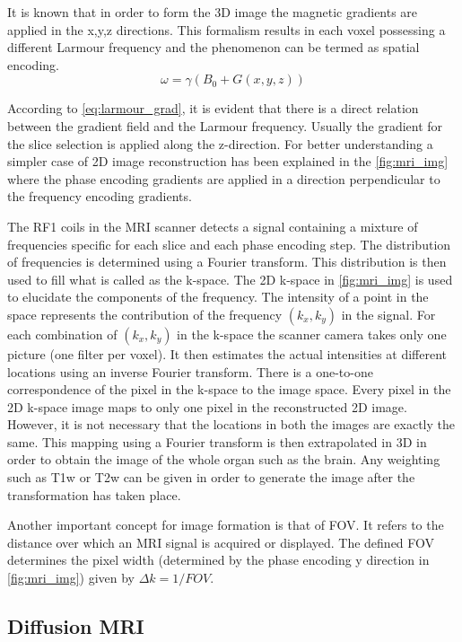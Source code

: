 \documentclass[msthesis.tex]{subfiles}
\begin{document}
It is known that in order to form the 3D image the magnetic gradients are applied in the x,y,z directions. This formalism results in each voxel possessing a different Larmour frequency and the phenomenon can be termed as spatial encoding. 
\begin{equation}
        \label{eq:larmour_grad}
          \omega = \gamma(B_0 + G(x, y, z))
     \end{equation}
       
According to \cref{eq:larmour_grad}, it is evident that there is a direct relation between the gradient field and the Larmour frequency. Usually the gradient for the slice selection is applied along the z-direction. For better understanding a simpler case of 2D image reconstruction has been explained in the \cref{fig:mri_img} where the phase encoding gradients are applied in a direction perpendicular to the frequency encoding gradients.

The \gls{RF1} coils in the \gls{MRI} scanner detects a signal containing a mixture of frequencies specific for each slice and each phase encoding step. The distribution of frequencies is determined using a Fourier transform. This distribution is then used to fill what is called as the k-space. The 2D k-space in \cref{fig:mri_img} is used to elucidate the components of the frequency. The intensity of a point in the space represents the contribution of the frequency $(k_x,k_y)$ in the signal. For each combination of $(k_x, k_y)$ in the k-space the scanner camera takes only one picture (one filter per voxel). It then estimates the actual intensities at different locations using an inverse Fourier transform. There is a one-to-one correspondence of the pixel in the k-space to the image space. Every pixel in the 2D k-space image maps to only one pixel in the reconstructed 2D image. However, it is not necessary that the locations in both the images are exactly the same. This mapping using a Fourier transform is then extrapolated in 3D in order to obtain the image of the whole organ such as the brain. Any weighting such as T1w or T2w can be given in order to generate the image after the transformation has taken place.

Another important concept for image formation is that of \gls{FOV}. It refers to the distance over which an \gls{MRI} signal is acquired or displayed. The defined \gls{FOV} determines the pixel width (determined by the phase encoding y direction in \cref{fig:mri_img}) given by $\Delta k = 1/FOV$. 

\subsection{Diffusion MRI}
\end{document}
